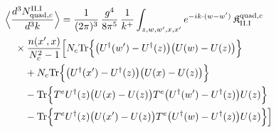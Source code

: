 \begin{align}\label{eq:S-II.I-2c}
&\Big\langle\frac{d^{3}N^{\rm II.I}_{{\rm quad},c}}{d^{3}k}\Big\rangle=\frac{1}{(2\pi)^{3}}\, \frac{g^{4}}{8\pi^{5}}\, \frac{1}{k^{+}} \int_{z,w,w',x,x'}e^{-ik\cdot(w-w')}\, \mathfrak{K}^{{\rm quad},c}_{\rm II.I}\notag\\
&\quad \times\frac{n(x',x)}{N_{c}^{2}-1}\Big[N_{c}{\rm Tr}\Big\{\big(U^{\dagger}(w')-U^{\dagger}(z)\big)\big(U(w)-U(z)\big)\Big\}\notag\\
&\quad\quad +N_{c}{\rm Tr}\Big\{\big(U^{\dagger}(x')-U^{\dagger}(z)\big)\big(U(x)-U(z)\big)\Big\}\notag\\
&\quad\quad -{\rm Tr}\Big\{T^{e}U^{\dagger}(z)\big(U(x)-U(z)\big)T^{e}\big(U^{\dagger}(w')-U^{\dagger}(z)\big)U(z)\Big\}\notag\\
&\quad\quad -{\rm Tr}\Big\{T^{e}U^{\dagger}(z)\big(U(x')-U(z)\big)T^{e}\big(U^{\dagger}(w)-U^{\dagger}(z)\big)U(z)\Big\}\Big]
\end{align}
